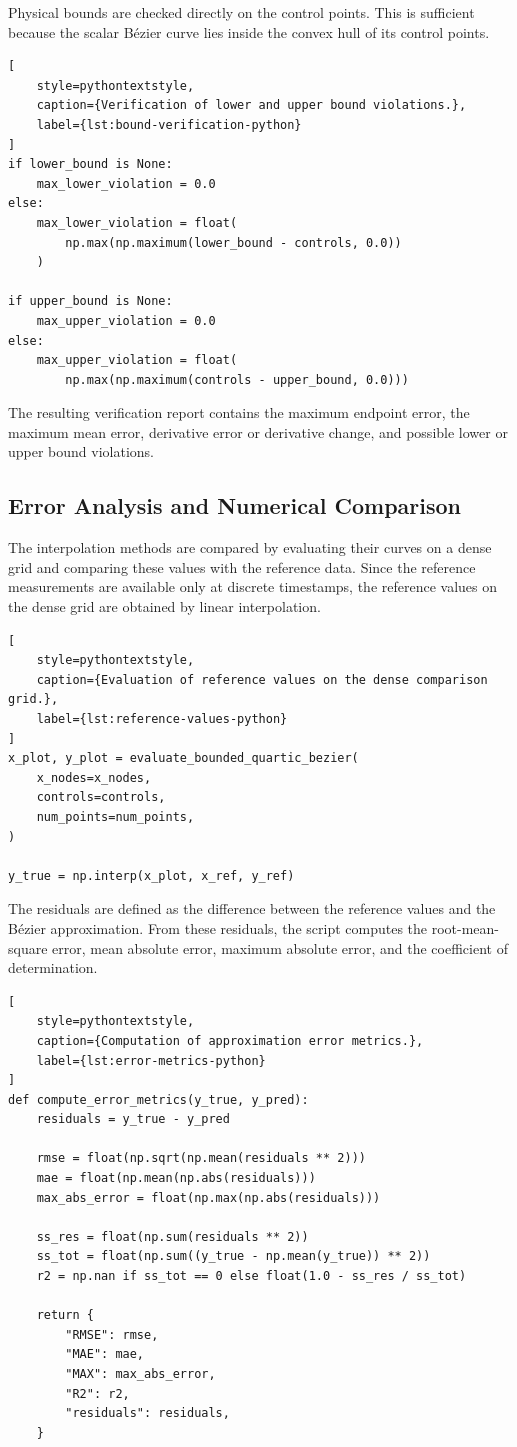 \documentclass[12pt,a4paper]{article}
\begin{document}
Physical bounds are checked directly on the control points. This is sufficient
because the scalar B\'ezier curve lies inside the convex hull of its control
points.

\begin{lstlisting}[
    style=pythontextstyle,
    caption={Verification of lower and upper bound violations.},
    label={lst:bound-verification-python}
]
if lower_bound is None:
    max_lower_violation = 0.0
else:
    max_lower_violation = float(
        np.max(np.maximum(lower_bound - controls, 0.0))
    )

if upper_bound is None:
    max_upper_violation = 0.0
else:
    max_upper_violation = float(
        np.max(np.maximum(controls - upper_bound, 0.0)))
\end{lstlisting}

The resulting verification report contains the maximum endpoint error, the
maximum mean error, derivative error or derivative change, and possible lower
or upper bound violations.

\subsection{Error Analysis and Numerical Comparison}

The interpolation methods are compared by evaluating their curves on a dense
grid and comparing these values with the reference data. Since the reference
measurements are available only at discrete timestamps, the reference values
on the dense grid are obtained by linear interpolation.

\begin{lstlisting}[
    style=pythontextstyle,
    caption={Evaluation of reference values on the dense comparison grid.},
    label={lst:reference-values-python}
]
x_plot, y_plot = evaluate_bounded_quartic_bezier(
    x_nodes=x_nodes,
    controls=controls,
    num_points=num_points,
)

y_true = np.interp(x_plot, x_ref, y_ref)
\end{lstlisting}

The residuals are defined as the difference between the reference values and
the B\'ezier approximation. From these residuals, the script computes the
root-mean-square error, mean absolute error, maximum absolute error, and the
coefficient of determination.

\begin{lstlisting}[
    style=pythontextstyle,
    caption={Computation of approximation error metrics.},
    label={lst:error-metrics-python}
]
def compute_error_metrics(y_true, y_pred):
    residuals = y_true - y_pred

    rmse = float(np.sqrt(np.mean(residuals ** 2)))
    mae = float(np.mean(np.abs(residuals)))
    max_abs_error = float(np.max(np.abs(residuals)))

    ss_res = float(np.sum(residuals ** 2))
    ss_tot = float(np.sum((y_true - np.mean(y_true)) ** 2))
    r2 = np.nan if ss_tot == 0 else float(1.0 - ss_res / ss_tot)

    return {
        "RMSE": rmse,
        "MAE": mae,
        "MAX": max_abs_error,
        "R2": r2,
        "residuals": residuals,
    }
\end{lstlisting}
\end{document}
